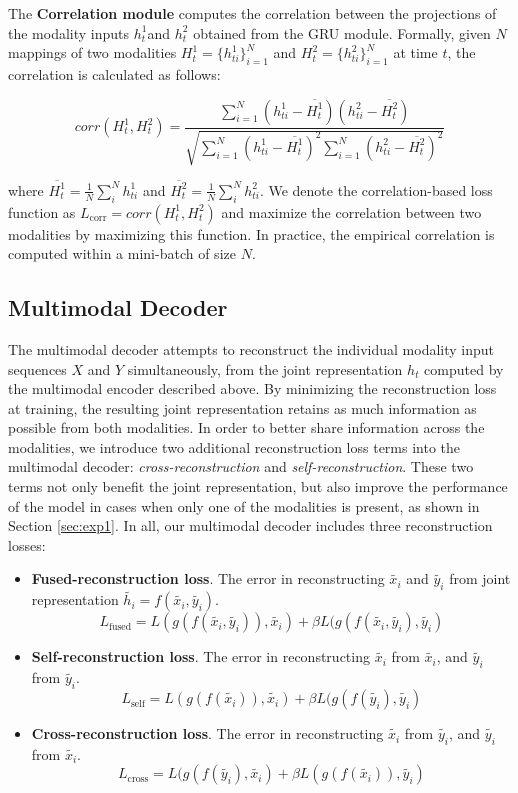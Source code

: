 \documentclass[10pt,twocolumn,letterpaper]{article}
\begin{document}
The \textbf{Correlation module} computes the correlation between the projections of the modality inputs  $h_t^1$and $h_t^2$ obtained from the GRU module. Formally, given $N$ mappings of two modalities $H_t^1 = \{h_{ti}^1\}_{i=1}^N$ and $H_t^2 = \{h_{ti}^2\}_{i=1}^N$ at time $t$, the correlation is calculated as follows:

$$corr(H_t^1, H_t^2) =
\frac{\sum_{i=1}^N (h_{ti}^1-\overline{H_t^1}) (h_{ti}^2-\overline{H_t^2})} {\sqrt{\sum_{i=1}^N (h_{ti}^1-\overline{H_t^1})^2 \sum_{i=1}^N (h_{ti}^2-\overline{H_t^2})^2}}
$$

\noindent where $\overline{H_t^1} = \frac{1}{N} \sum_i^N{h_{ti}^1}$ and $\overline{H_t^2} = \frac{1}{N} \sum_i^N{h_{ti}^2}$. We denote the correlation-based loss function as $L_{\text{corr}} = corr(H_t^1, H_t^2)$ and maximize the correlation between two modalities by maximizing this function. In practice, the empirical correlation is computed within a mini-batch of size $N$.

\subsection{Multimodal Decoder}
\label{sec:decoder}
The multimodal decoder attempts to reconstruct the individual modality input sequences $X$ and $Y$ simultaneously, from the joint representation $h_t$ computed by the multimodal encoder described above. By minimizing the reconstruction loss at training, the resulting joint representation retains as much information as possible from both modalities. In order to better share information across the modalities, we introduce two additional reconstruction loss terms into the multimodal decoder: \textit{cross-reconstruction} and \textit{self-reconstruction}. These two terms not only benefit the joint representation, but also improve the performance of the model in cases when only one of the modalities is present, as shown in Section \ref{sec:exp1}. In all, our multimodal decoder includes three reconstruction losses:

\begin{itemize}
\item \textbf{Fused-reconstruction loss}. The error in reconstructing $\tilde{x_i}$ and $\tilde{y_i}$ from joint representation $\tilde{h_i} = f(\tilde{x_i}, \tilde{y_i})$.
$$ L_{\text{fused}} = L(g(f(\tilde{x_i}, \tilde{y_i})), \tilde{x_i}) + \beta L(g(f(\tilde{x_i}, \tilde{y_i}), \tilde{y_i})$$

\item \textbf{Self-reconstruction loss}. The error in reconstructing $\tilde{x_i}$ from $\tilde{x_i}$, and $\tilde{y_i}$ from $\tilde{y_i}$.
$$ L_{\text{self}} = L(g(f(\tilde{x_i})), \tilde{x_i}) + \beta L(g(f(\tilde{y_i}), \tilde{y_i})$$

\item \textbf{Cross-reconstruction loss}. The error in reconstructing $\tilde{x_i}$ from $\tilde{y_i}$, and $\tilde{y_i}$ from $\tilde{x_i}$.
$$ L_{\text{cross}} = L(g(f(\tilde{y_i}), \tilde{x_i}) + \beta L(g(f(\tilde{x_i})), \tilde{y_i})$$
\end{itemize}
\end{document}
